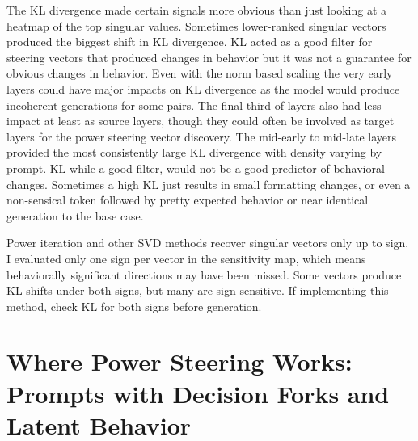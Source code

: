 \documentclass{article}
\begin{document}
The KL divergence made certain signals more obvious than just looking at a heatmap of the top singular values. Sometimes lower-ranked singular vectors produced the biggest shift in KL divergence. KL acted as a good filter for steering vectors that produced changes in behavior but it was not a guarantee for obvious changes in behavior. Even with the norm based scaling the very early layers could have major impacts on KL divergence as the model would produce incoherent generations for some pairs. The final third of layers also had less impact at least as source layers, though they could often be involved as target layers for the power steering vector discovery. The mid-early to mid-late layers provided the most consistently large KL divergence with density varying by prompt. KL while a good filter, would not be a good predictor of behavioral changes. Sometimes a high KL just results in small formatting changes, or even a non-sensical token followed by pretty expected behavior or near identical generation to the base case.

Power iteration and other SVD methods recover singular vectors only up to sign. I evaluated only one sign per vector in the sensitivity map, which means behaviorally significant directions may have been missed. Some vectors produce KL shifts under both signs, but many are sign-sensitive. If implementing this method, check KL for both signs before generation.

\section{Where Power Steering Works: Prompts with Decision Forks and Latent Behavior}
\end{document}
